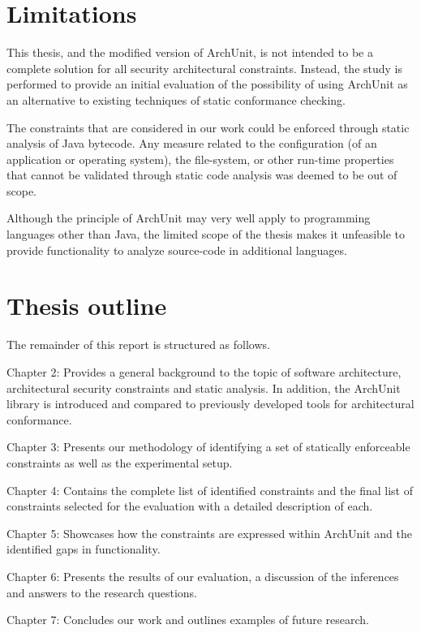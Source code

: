 \section{Limitations}
\label{sec:limitations}

This thesis, and the modified version of ArchUnit, is not intended to be a complete solution for all security architectural constraints. Instead, the study is performed to provide an initial evaluation of the possibility of using ArchUnit as an alternative to existing techniques of static conformance checking. 

The constraints that are considered in our work could be enforced through static analysis of Java bytecode. Any measure related to the configuration (of an application or operating system), the file-system, or other run-time properties that cannot be validated through static code analysis was deemed to be out of scope. 

Although the principle of ArchUnit may very well apply to programming languages other than Java, the limited scope of the thesis makes it unfeasible to provide functionality to analyze source-code in additional languages.

\section{Thesis outline}

The remainder of this report is structured as follows.

Chapter 2: Provides a general background to the topic of software architecture, architectural security constraints and static analysis. In addition, the ArchUnit library is introduced and compared to previously developed tools for architectural conformance.  

Chapter 3: Presents our methodology of identifying a set of statically enforceable constraints as well as the experimental setup. 

Chapter 4: Contains the complete list of identified constraints and the final list of constraints selected for the evaluation with a detailed description of each. 

Chapter 5: Showcases how the constraints are expressed within ArchUnit and the identified gaps in functionality.

Chapter 6: Presents the results of our evaluation, a discussion of the inferences and answers to the research questions. 

Chapter 7: Concludes our work and outlines examples of future research.